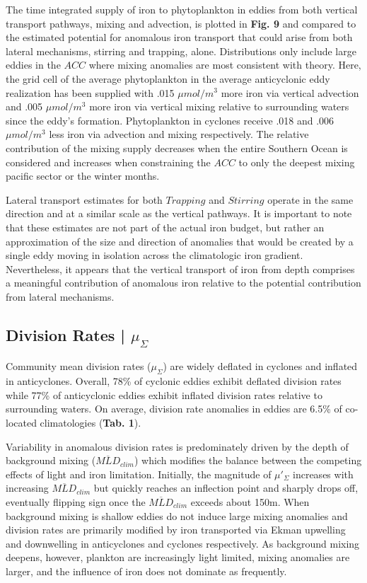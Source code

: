 \documentclass{article}
\begin{document}
The time integrated supply of iron to phytoplankton in eddies from both vertical transport pathways, mixing and advection, is plotted in \textbf{Fig. 9} and compared to  the estimated potential for anomalous iron transport that could arise from both lateral mechanisms, stirring and trapping, alone. Distributions only include large eddies in the $ACC$ where mixing anomalies are most consistent with theory. Here, the grid cell of the average phytoplankton in the average anticyclonic eddy realization has been supplied with .015 $\mu mol/m^3$ more iron via vertical advection and .005 $\mu mol/m^3$ more iron via vertical mixing relative to surrounding waters since the eddy's formation. Phytoplankton in cyclones receive .018 and .006 $\mu mol/m^3$ less iron via advection and mixing respectively. The relative contribution of the mixing supply decreases when the entire Southern Ocean is considered and increases when constraining the $ACC$ to only the deepest mixing pacific sector or the winter months.  

Lateral transport estimates for both $Trapping$ and $Stirring$ operate in the same direction and at a similar scale as the vertical pathways. It is important to note that these estimates are not part of the actual iron budget, but rather an approximation of the size and direction of anomalies that would be created by a single eddy moving in isolation across the climatologic iron gradient.  Nevertheless, it appears that the vertical transport of iron from depth comprises a meaningful contribution of anomalous iron relative to the potential contribution from lateral mechanisms.   


\subsection{Division Rates | $\mu_\Sigma$ }

Community mean division rates ($\mu_\Sigma$) are widely deflated in cyclones and inflated in anticyclones. Overall, 78\% of cyclonic eddies exhibit deflated division rates while 77\% of anticyclonic eddies exhibit inflated division rates relative to surrounding waters. On average, division rate anomalies in eddies are 6.5\% of co-located climatologies (\textbf{Tab. 1}).

Variability in anomalous division rates is predominately driven by the depth of background mixing ($\overline{MLD}_{clim}$) which modifies the balance between the competing effects of light and iron limitation. Initially, the magnitude of $\mu'_\Sigma$  increases with increasing $\overline{MLD}_{clim}$ but quickly reaches an inflection point and sharply drops off, eventually flipping sign once the $\overline{MLD}_{clim}$ exceeds about 150m. When background mixing is shallow eddies do not induce large mixing anomalies and division rates are primarily modified by iron transported via Ekman upwelling and downwelling in anticyclones and cyclones respectively.  As background mixing deepens, however, plankton are increasingly light limited, mixing anomalies are larger, and the influence of iron does not dominate as frequently. 
\end{document}
